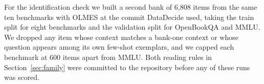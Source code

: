 For the identification check we built a second bank of 6,808 items from the same ten benchmarks with OLMES at the commit DataDecide used, taking the train split for eight benchmarks and the validation split for OpenBookQA and MMLU. We dropped any item whose context matches a bank-one context or whose question appears among its own few-shot exemplars, and we capped each benchmark at 600 items apart from MMLU. Both reading rules in Section~\ref{sec:family} were committed to the repository before any of these runs was scored.

